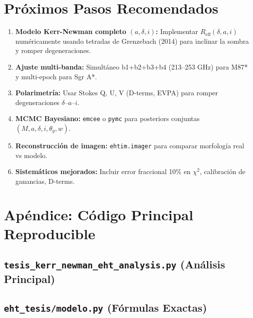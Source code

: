 \documentclass[12pt,a4paper]{article}
\begin{document}
\section{Próximos Pasos Recomendados}

\begin{enumerate}
    \item \textbf{Modelo Kerr-Newman completo $(a, \delta, i)$:} Implementar $R_{\text{eff}}(\delta, a, i)$ numéricamente usando tetradas de Grenzebach (2014) para inclinar la sombra y romper degeneraciones.
    \item \textbf{Ajuste multi-banda:} Simultáneo b1+b2+b3+b4 (213--253 GHz) para M87* y multi-epoch para Sgr A*.
    \item \textbf{Polarimetría:} Usar Stokes Q, U, V (D-terms, EVPA) para romper degeneraciones $\delta$--$a$--$i$.
    \item \textbf{MCMC Bayesiano:} \texttt{emcee} o \texttt{pymc} para posteriors conjuntas $(M, a, \delta, i, \theta_g, w)$.
    \item \textbf{Reconstrucción de imagen:} \texttt{ehtim.imager} para comparar morfología real vs modelo.
    \item \textbf{Sistemáticos mejorados:} Incluir error fraccional 10\% en $\chi^2$, calibración de ganancias, D-terms.
\end{enumerate}

\section{Apéndice: Código Principal Reproducible}

\subsection{\texttt{tesis\_kerr\_newman\_eht\_analysis.py} (Análisis Principal)}



\subsection{\texttt{eht\_tesis/modelo.py} (Fórmulas Exactas)}
\end{document}
